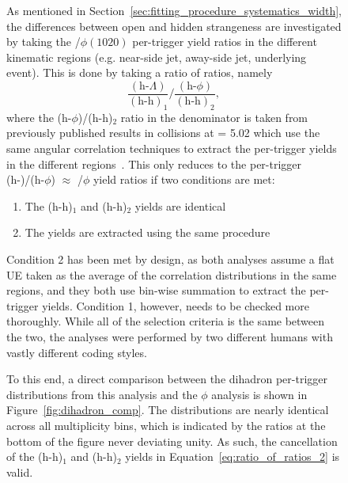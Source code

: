 \begin{figure}
As mentioned in Section~\ref{sec:fitting_procedure_systematics_width}, the differences between open and hidden strangeness are investigated by taking the \lmb/$\phi(1020)$ per-trigger yield ratios in the different kinematic regions (e.g. near-side jet, away-side jet, underlying event). This is done by taking a ratio of ratios, namely
%
\begin{equation}
    \label{eq:ratio_of_ratios_2}
    \frac{(\text{h-}\Lambda)}{(\text{h-h})_{1}}/\frac{(\text{h-}\phi)}{(\text{h-h})_{2}},
\end{equation}
%
where the (h-$\phi$)/(h-h)$_2$ ratio in the denominator is taken from previously published results in \pPb collisions at \snn = 5.02 \TeV which use the same angular correlation techniques to extract the per-trigger yields in the different regions~\cite{JustinPaper}. This only reduces to the per-trigger (h-\lmb)/(h-$\phi$) $\approx$ \lmb/$\phi$ yield ratios if two conditions are met:
%
\begin{enumerate}
    \item The (h-h)$_1$ and (h-h)$_2$ yields are identical
    \item The yields are extracted using the same procedure
\end{enumerate}
% 
Condition 2 has been met by design, as both analyses assume a flat UE taken as the average of the correlation distributions in the same \dphi regions, and they both use bin-wise summation to extract the per-trigger yields. Condition 1, however, needs to be checked more thoroughly. While all of the selection criteria is the same between the two, the analyses were performed by two different humans with vastly different coding styles.

To this end, a direct comparison between the dihadron per-trigger \dphi distributions from this analysis and the $\phi$ analysis is shown in Figure~\ref{fig:dihadron_comp}. The distributions are nearly identical across all multiplicity bins, which is indicated by the ratios at the bottom of the figure never deviating unity. As such, the cancellation of the (h-h)$_1$ and (h-h)$_2$ yields in Equation~\ref{eq:ratio_of_ratios_2} is valid.


\end{figure}
